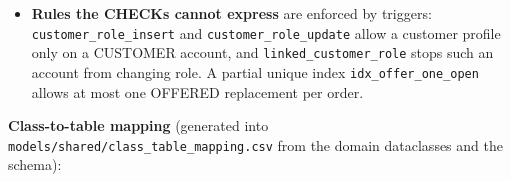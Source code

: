 \begin{itemize}
\item \textbf{Rules the CHECKs cannot express} are enforced by triggers: \texttt{customer\_\allowbreak{}role\_\allowbreak{}insert} and \texttt{customer\_\allowbreak{}role\_\allowbreak{}update} allow a customer profile only on a CUSTOMER account, and \texttt{linked\_\allowbreak{}customer\_\allowbreak{}role} stops such an account from changing role. A partial unique index \texttt{idx\_\allowbreak{}offer\_\allowbreak{}one\_\allowbreak{}open} allows at most one OFFERED replacement per order.

\end{itemize}
\textbf{Class-to-table mapping} (generated into \texttt{models/\allowbreak{}shared/\allowbreak{}class\_\allowbreak{}table\_\allowbreak{}mapping.\allowbreak{}csv} from the domain dataclasses and the schema):

